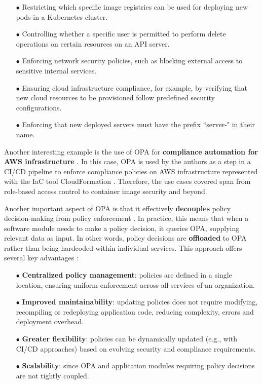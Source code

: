 \begin{itemize}[itemsep=0.2pt, topsep=1pt]
    \item[$\bullet$] Restricting which specific image registries can be used for deploying new pods in a Kubernetes cluster.
    \item[$\bullet$] Controlling whether a specific user is permitted to perform delete operations on certain resources on an API server.
    \item[$\bullet$] Enforcing network security policies, such as blocking external access to sensitive internal services.
    \item[$\bullet$] Ensuring cloud infrastructure compliance, for example, by verifying that new cloud resources to be provisioned follow predefined security configurations.
    \item[$\bullet$] Enforcing that new deployed servers must have the prefix ``server-" in their name.
\end{itemize}

Another interesting example is the use of OPA for \textbf{compliance automation for AWS infrastructure} \cite{10612535}. 
In this case, OPA is used by the authors as a step in a CI/CD pipeline to enforce compliance policies on AWS infrastructure represented with the IaC tool CloudFormation \cite{10612535}.
Therefore, the use cases covered span from role-based access control to container image security and beyond.
\newline

Another important aspect of OPA is that it effectively \textbf{decouples} policy decision-making from policy enforcement \cite{opa_docs}.
In practice, this means that when a software module needs to make a policy decision, it queries OPA, supplying relevant data as input. 
In other words, policy decisions are \textbf{offloaded} to OPA rather than being hardcoded within individual services. 
This approach offers several key advantages \cite{opa_docs}:
\begin{itemize}[itemsep=0.2pt, topsep=1pt]
  \item[$\bullet$] \textbf{Centralized policy management}: policies are defined in a single location, ensuring uniform enforcement across all services of an organization.
  \item[$\bullet$] \textbf{Improved maintainability}: updating policies does not require modifying, recompiling or redeploying application code, reducing complexity, errors and deployment overhead.
  \item[$\bullet$] \textbf{Greater flexibility}: policies can be dynamically updated (e.g., with CI/CD approaches) based on evolving security and compliance requirements. 
  \item[$\bullet$] \textbf{Scalability}: since OPA and application modules requiring policy decisions are not tightly coupled.
\end{itemize} 

